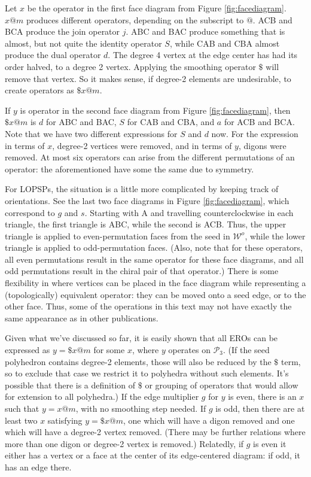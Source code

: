 \documentclass[12pt]{amsart}%
\begin{document}
Let $x$ be the operator in the first face diagram from Figure
\ref{fig:facediagram}. $x@m$ produces different operators, depending on the
subscript to $@$. ACB and BCA produce the join operator $j$. ABC and BAC
produce something that is almost, but not quite the identity operator $S$,
while CAB and CBA almost produce the dual operator $d$. The degree 4 vertex at
the edge center has had its order halved, to a degree 2 vertex. Applying the
smoothing operator $\$$ will remove that vertex. So it makes sense, if degree-2
elements are undesirable, to create operators as $\$x@m$.

If $y$ is operator in the second face diagram from Figure \ref{fig:facediagram},
then $\$x@m$ is $d$ for ABC and BAC, $S$ for CAB and CBA, and $a$ for ACB and
BCA. Note that we have two different expressions for $S$ and $d$ now. For the
expression in terms of $x$, degree-2 vertices were removed, and in terms of
$y$, digons were removed.
At most six operators can arise from the different permutations of an operator:
the aforementioned have some the same due to symmetry.

For LOPSPs, the situation is a little more complicated by keeping track of
orientations. See the last two face diagrams in Figure \ref{fig:facediagram},
which correspond to $g$ and $s$. Starting with A and travelling
counterclockwise in each triangle, the first triangle is ABC, while the second
is ACB. Thus, the upper triangle is applied to even-permutation faces from the
seed in $\mathcal{W}^o$, while the lower triangle is applied to odd-permutation
faces. (Also, note that for these operators,
all even permutations result in the same operator for these face diagrams,
and all odd permutations result in the chiral pair of that operator.) There is
some flexibility in where vertices can be placed in the face diagram while
representing a (topologically) equivalent operator: they can be moved onto a
seed edge, or to the other face. Thus, some of the operations in this text may
not have exactly the same appearance as in other publications.

Given what we've discussed so far, it is easily shown that all EROs can be
expressed as $y = \$x@m$ for some $x$, where $y$ operates on $\mathcal{P}_3$.
(If the seed polyhedron contains degree-2 elements, those will also be reduced
by the $\$$ term, so to exclude that case we restrict it to polyhedra without
such elements. It's possible that there is a definition of $\$$ or grouping
of operators that would allow for extension to all polyhedra.) If the edge
multiplier $g$ for $y$ is even, there is an $x$ such that $y = x@m$, with no
smoothing step needed. If $g$ is odd, then there are at least two $x$
satisfying $y = \$x@m$, one which will have a digon removed and one which will
have a degree-2 vertex removed. (There may be further relations where more than
one digon or degree-2 vertex is removed.) Relatedly, if $g$ is even it either
has a vertex or a face at the center of its edge-centered diagram:
if odd, it has an edge there.
\end{document}

